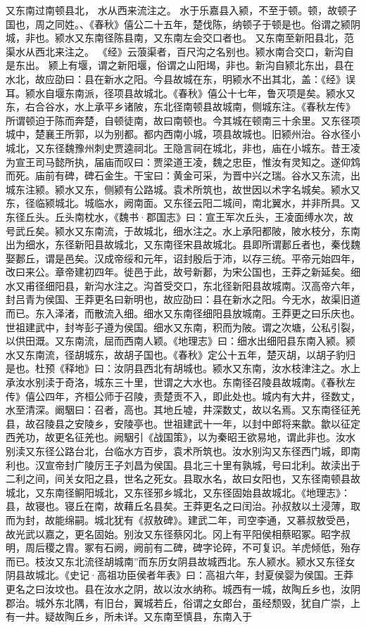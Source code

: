 \documentclass[12pt,UTF8]{ctexbook}
\begin{document}
又东南过南顿县北， 水从西来流注之。
水于乐嘉县入颍，不至于顿。顿，故顿子国也，周之同姓。、《春秋》僖公二十五年，楚伐陈，纳顿子于顿是也。俗谓之颍阴城，非也。颍水又东南径陈县南，又东南左会交口者也。
又东南至新阳县北，范渠水从西北来注之。
《经》云蒗渠者，百尺沟之名别也。颍水南合交口，新沟自是东出。
颍上有堰，谓之新阳堰，俗谓之山阳堨，非也。新沟自颍北东出，县在水北，故应劭曰：县在新水之阳。今县故城在东，明颍水不出其北，盖：《经》误耳。颍水自堰东南派，径项县故城北。《春秋》僖公十七年，鲁灭项是矣。颍水又东，右合谷水，水上承平乡诸陂，东北径南顿县故城南，侧城东注。《春秋左传》所谓顿迫于陈而奔楚，自顿徒南，故曰南顿也。今其城在顿南三十余里。又东径项城中，楚襄王所郭，以为别都。都内西南小城，项县故城也。旧颍州治。谷水径小城北，又东径魏豫州刺史贾逵祠北。王隐言祠在城北，非也，庙在小城东。昔王凌为宣王司马懿所执，届庙而叹曰：贾梁道王凌，魏之忠臣，惟汝有灵知之。遂仰鸩而死。庙前有碑，碑石金生。干宝曰：黄金可采，为晋中兴之瑞。谷水又东流，出城东注颍。颍水又东，侧颍有公路城。袁术所筑也，故世因以术字名城矣。颍水又东，径临颍城北。城临水，阙南面。又东径云阳二城间，南北翼水，并非所具。又东径丘头。丘头南枕水，《魏书·郡国志》曰：宣王军次丘头，王凌面缚水次，故号武丘矣。颍水又东南流，于故城北，细水注之。水上承阳都陂，陂水枝分，东南出为细水，东径新阳县故城北，又东南径宋县故城北。县即所谓郪丘者也，秦伐魏娶郪丘，谓是邑矣。汉成帝绥和元年，诏封殷后于沛，以存三统。平帝元始四年，改曰来公。章帝建初四年。徙邑于此，故号新郪，为宋公国也，王莽之新延矣。细水又甫径细阳县，新沟水注之。沟首受交口，东北径新阳县故城南。汉高帝六年，封吕青为侯国、王莽更名曰新明也，故应劭曰：县在新水之阳。今无水，故渠旧道而已。东入泽渚，而散流入细。细水又东南径细阳县放城南。王莽更之曰乐庆也。世祖建武中，封岑彭子遵为侯国。细水又东南，积而为陂。谓之次塘，公私引裂，以供田溉。又东南流，屈而西南人颖。《地理志》曰：细水出细阳县东南入颍。颍水又东南流，径胡城东，故胡子国也。《春秋》定公十五年，楚灭胡，以胡子豹归是也。杜预《释地》曰：汝阴县西北有胡城也。颍水又东南，汝水枝津注之。水上承汝水别渎于奇洛，城东三十里，世谓之大水也。东南径召陵县故城南。《春秋左传》僖公四年，齐桓公师于召陵，责楚贡不入，即此处也。城内有大井，径数丈，水至清深。阚駰曰：召者，高也。其地丘墟，井深数丈，故以名焉。又东南径征羌县，故召陵县之安陵乡，安陵亭也。世祖建武十一年，以封中郎将来歙。歙以征定西羌功，故更名征羌也。阙駰引《战国策》，以为秦昭王欲易地，谓此非也。汝水别渎又东径公路台北，台临水方百步，袁术所筑也。汝水别沟又东径西门城，即南利也。汉宣帝封广陵厉王子刘昌为侯国。县北三十里有孰城，号曰北利。故渎出于二利之间，间关女阳之县，世名之死女。县取水名，故曰女阳也，又东径南顿县故城北，又东南径鲖阳城北，又东径邪乡城北，又东径固始县故城北。《地理志》：县，故寝也。寝丘在南，故藉丘名县矣。王莽更名之曰闰治。孙叔敖以土浸薄，取而为封，故能绵嗣。城北犹有《叔敖碑》。建武二年，司空李通，又慕叔敖受邑，故光武以嘉之，更名固始。别汝又东径蔡冈北。冈上有平阳侯相蔡昭冢。昭字叔明，周后稷之胄。冢有石阙，阙前有二碑，碑字论碎，不可复识。羊虎倾低，殆存而已。枝汝又东北流径胡城南”而东历女阴县故城西北。东人颍水。颍水又东径女阴县故城北。《史记·高祖功臣侯者年表》曰：高祖六年，封夏侯婴为侯国。王莽更名之曰汝坟也。县在汝水之阴，故以汝水纳称。城西有一城，故陶丘乡也，汝阴郡治。城外东北隅，有旧台，翼城若丘，俗谓之女郎台，虽经颓毁，犹自广崇，上有一井。疑故陶丘乡，所未详。又东南至慎县，东南入于
\end{document}
